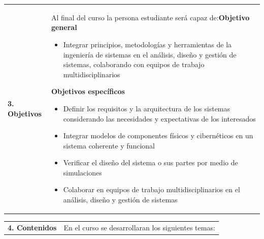 \documentclass[letterpaper]{article}%
\begin{document}
\vspace*{4mm}%
\newline%
\begin{tabularx}{\textwidth}{p{3cm}p{13cm}}%
\par\fontsize{12}{14}\selectfont \textbf{\textcolor{parte}{3. Objetivos}}&Al final del curso la persona estudiante será capaz de:\newline\newline \textbf{Objetivo general}\begin{itemize}\item Integrar principios, metodologías y herramientas de la ingeniería de sistemas en el análisis, diseño y gestión de sistemas, colaborando con equipos de trabajo multidisciplinarios\end{itemize} \vspace{2mm}\textbf{Objetivos específicos}\begin{itemize}\item Definir los requisitos y la arquitectura de los sistemas considerando las necesidades y expectativas de los interesados\item Integrar modelos de componentes físicos y cibernéticos en un sistema coherente y funcional\item Verificar el diseño del sistema o sus partes por medio de simulaciones\item Colaborar en equipos de trabajo multidisciplinarios en el análisis, diseño y gestión de sistemas\end{itemize}\\%
\end{tabularx}%
\newpage%
\begin{tabularx}{\textwidth}{p{3cm}p{13cm}}%
\par\fontsize{12}{14}\selectfont \textbf{\textcolor{parte}{4. Contenidos}}&En el curso se desarrollaran los siguientes temas:\\%
\end{tabularx}%
\newline%
\end{document}
